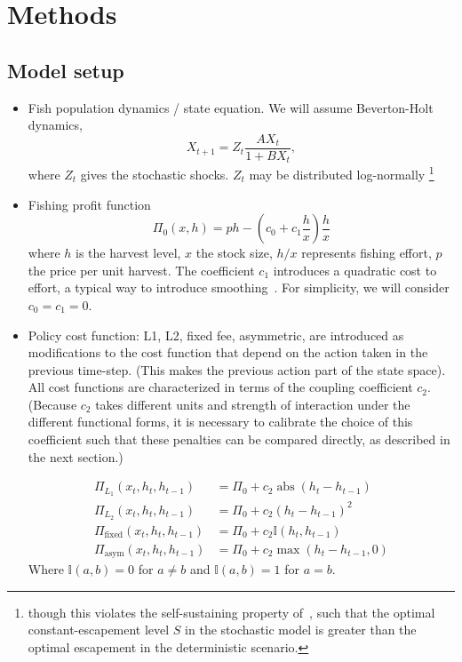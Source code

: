 \documentclass[authoryear, review, 12pt]{elsarticle}
\begin{document}
\section{Methods}

\subsection{Model setup}

\begin{itemize}
  \item   Fish population dynamics / state equation.  We will assume Beverton-Holt dynamics,
    \begin{equation} 
      X_{t+1} = Z_t \frac{A X_t}{1 + B X_t}, 
    \end{equation}
where $Z_t$ gives the stochastic shocks.  $Z_t$ may be distributed log-normally \footnote{though this violates the self-sustaining property of~\citet{Reed1979}, such that the optimal constant-escapement level $S$ in the stochastic model is greater than the optimal escapement in the deterministic scenario.}

\item   Fishing profit function 
  \begin{equation} 
    \Pi_0(x,h) = p h - \left( c_0  + c_1 \frac{h}{x} \right) \frac{h}{x} \label{profit}
  \end{equation}
  where $h$ is the harvest level, $x$ the stock size, $h/x$ represents
  fishing effort, $p$ the price per unit harvest.  The coefficient $c_1$
  introduces a quadratic cost to effort, a typical way to introduce
  smoothing~\citep[\emph{e.g.}][]{Singh2006}.  For simplicity, we will consider $c_0 =
  c_1 = 0$.

\item
Policy cost function: L1, L2, fixed fee, asymmetric, are introduced
as modifications to the cost function that depend on the action
taken in the previous time-step.  (This makes the previous action part
of the state space).   All cost functions are characterized in terms
of the coupling coefficient $c_2$.  (Because $c_2$ takes different units
and strength of interaction under the different functional forms, it is
necessary to calibrate the choice of this coefficient such that these
penalties can be compared directly, as described in the next section.)

  \begin{align} 
    \Pi_{L_1}(x_t,h_t, h_{t-1}) &= \Pi_0 + c_2 \operatorname{abs}\left( h_t - h_{t-1} \right) \label{L1} \\
    \Pi_{L_2}(x_t,h_t, h_{t-1}) &= \Pi_0 + c_2 \left( h_t - h_{t-1} \right)^2 \label{L2} \\
    \Pi_{\textrm{fixed}}(x_t,h_t, h_{t-1}) &= \Pi_0 + c_2 \mathbb{I}(h_t, h_{t-1})  \label{fixed_fee} \\
    \Pi_{\textrm{asym}}(x_t,h_t, h_{t-1}) &= \Pi_0 + c_2 \operatorname{max}\left( h_t - h_{t-1}, 0 \right) \label{asym}
  \end{align}
  Where $\mathbb{I}(a,b) = 0$ for $a \neq b$ and  $\mathbb{I}(a,b) = 1$ for $a = b$.  


\end{itemize}
\end{document}
